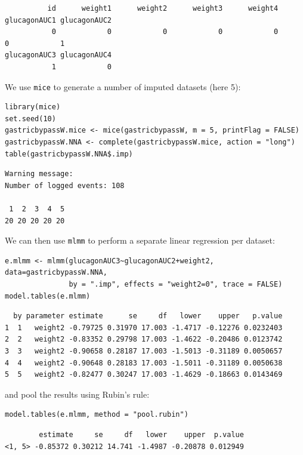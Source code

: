 \documentclass[12pt]{article}
\begin{document}
\begin{verbatim}
          id      weight1      weight2      weight3      weight4 glucagonAUC1 glucagonAUC2 
           0            0            0            0            0            0            1 
glucagonAUC3 glucagonAUC4 
           1            0
\end{verbatim}


We use \texttt{mice} to generate a number of imputed datasets (here 5):
\lstset{language=r,label= ,caption= ,captionpos=b,numbers=none}
\begin{lstlisting}
library(mice)
set.seed(10)
gastricbypassW.mice <- mice(gastricbypassW, m = 5, printFlag = FALSE)
gastricbypassW.NNA <- complete(gastricbypassW.mice, action = "long")
table(gastricbypassW.NNA$.imp)
\end{lstlisting}

\begin{verbatim}
Warning message:
Number of logged events: 108

 1  2  3  4  5 
20 20 20 20 20
\end{verbatim}


We can then use \texttt{mlmm} to perform a separate linear regression per dataset:
\lstset{language=r,label= ,caption= ,captionpos=b,numbers=none}
\begin{lstlisting}
e.mlmm <- mlmm(glucagonAUC3~glucagonAUC2+weight2, data=gastricbypassW.NNA,
               by = ".imp", effects = "weight2=0", trace = FALSE)
model.tables(e.mlmm)
\end{lstlisting}

\begin{verbatim}
  by parameter estimate      se     df   lower    upper   p.value
1  1   weight2 -0.79725 0.31970 17.003 -1.4717 -0.12276 0.0232403
2  2   weight2 -0.83352 0.29798 17.003 -1.4622 -0.20486 0.0123742
3  3   weight2 -0.90658 0.28187 17.003 -1.5013 -0.31189 0.0050657
4  4   weight2 -0.90648 0.28183 17.003 -1.5011 -0.31189 0.0050638
5  5   weight2 -0.82477 0.30247 17.003 -1.4629 -0.18663 0.0143469
\end{verbatim}


and pool the results using Rubin's rule:
\lstset{language=r,label= ,caption= ,captionpos=b,numbers=none}
\begin{lstlisting}
model.tables(e.mlmm, method = "pool.rubin")
\end{lstlisting}

\begin{verbatim}
        estimate     se     df   lower    upper  p.value
<1, 5> -0.85372 0.30212 14.741 -1.4987 -0.20878 0.012949
\end{verbatim}
\end{document}
